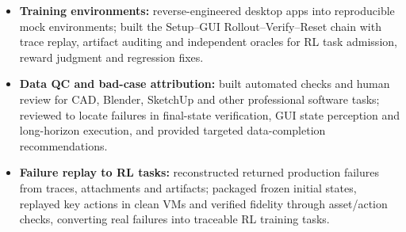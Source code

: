 \begin{itemize}
  \item \textbf{Training environments:} reverse-engineered desktop apps into reproducible mock environments; built the Setup--GUI Rollout--Verify--Reset chain with trace replay, artifact auditing and independent oracles for RL task admission, reward judgment and regression fixes.
  \item \textbf{Data QC and bad-case attribution:} built automated checks and human review for CAD, Blender, SketchUp and other professional software tasks; reviewed  to locate failures in final-state verification, GUI state perception and long-horizon execution, and provided targeted data-completion recommendations.
  \item \textbf{Failure replay to RL tasks:} reconstructed returned production failures from traces, attachments and artifacts; packaged frozen initial states, replayed key actions in clean VMs and verified fidelity through asset/action checks, converting real failures into traceable RL training tasks.
\end{itemize}
\entryspace
{}
